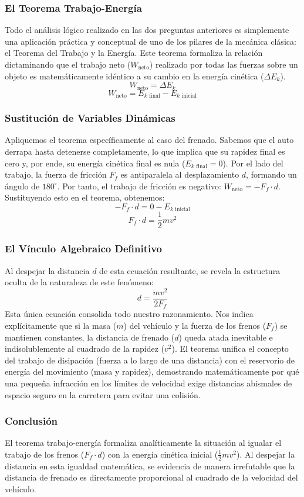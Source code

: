\documentclass[a4paper,12pt]{article}
\begin{document}
\subsubsection*{El Teorema Trabajo-Energía}
Todo el análisis lógico realizado en las dos preguntas anteriores es simplemente una aplicación práctica y conceptual de uno de los pilares de la mecánica clásica: el Teorema del Trabajo y la Energía. Este teorema formaliza la relación dictaminando que el trabajo neto ($W_{\text{neto}}$) realizado por todas las fuerzas sobre un objeto es matemáticamente idéntico a su cambio en la energía cinética ($\Delta E_k$).
$$W_{\text{neto}} = \Delta E_k$$
$$W_{\text{neto}} = E_{k\text{ final}} - E_{k\text{ inicial}}$$

\subsubsection*{Sustitución de Variables Dinámicas}
Apliquemos el teorema específicamente al caso del frenado. Sabemos que el auto derrapa hasta detenerse completamente, lo que implica que su rapidez final es cero y, por ende, su energía cinética final es nula ($E_{k\text{ final}} = 0$).
Por el lado del trabajo, la fuerza de fricción $F_f$ es antiparalela al desplazamiento $d$, formando un ángulo de $180^\circ$. Por tanto, el trabajo de fricción es negativo: $W_{\text{neto}} = - F_f \cdot d$.
Sustituyendo esto en el teorema, obtenemos:
$$- F_f \cdot d = 0 - E_{k\text{ inicial}}$$
$$F_f \cdot d = \frac{1}{2} m v^2$$

\subsubsection*{El Vínculo Algebraico Definitivo}
Al despejar la distancia $d$ de esta ecuación resultante, se revela la estructura oculta de la naturaleza de este fenómeno:
$$d = \frac{m v^2}{2 F_f}$$
Esta única ecuación consolida todo nuestro razonamiento. Nos indica explícitamente que si la masa ($m$) del vehículo y la fuerza de los frenos ($F_f$) se mantienen constantes, la distancia de frenado ($d$) queda atada inevitable e indisolublemente al cuadrado de la rapidez ($v^2$). 
El teorema unifica el concepto del trabajo de disipación (fuerza a lo largo de una distancia) con el reservorio de energía del movimiento (masa y rapidez), demostrando matemáticamente por qué una pequeña infracción en los límites de velocidad exige distancias abismales de espacio seguro en la carretera para evitar una colisión.

\subsubsection*{Conclusión}
El teorema trabajo-energía formaliza analíticamente la situación al igualar el trabajo de los frenos ($F_f \cdot d$) con la energía cinética inicial ($\frac{1}{2}mv^2$). Al despejar la distancia en esta igualdad matemática, se evidencia de manera irrefutable que la distancia de frenado es directamente proporcional al cuadrado de la velocidad del vehículo.
\end{document}
